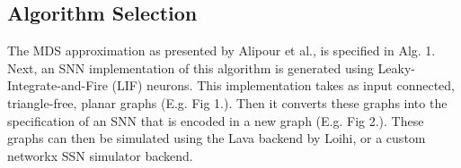 
\subsection*{Algorithm Selection}\label{subsec:algorithm}
The MDS approximation as presented by Alipour et al., is specified in Alg. 1.
Next, an SNN implementation of this algorithm is generated using Leaky-Integrate-and-Fire (LIF) neurons. This implementation takes as input connected, triangle-free, planar graphs (E.g. Fig 1.). Then it converts these graphs into the specification of an SNN that is encoded in a new graph (E.g. Fig 2.). These graphs can then be simulated using the Lava backend by Loihi, or a custom networkx SSN simulator backend.
